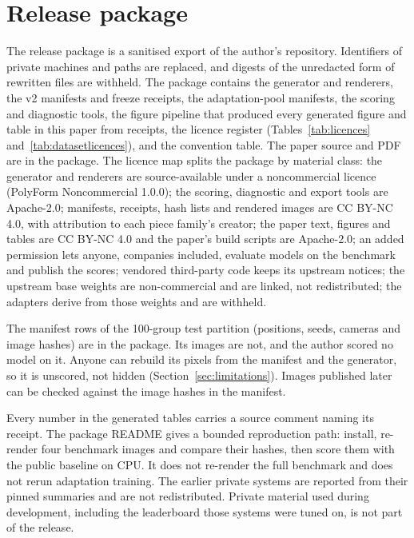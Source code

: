 \section{Release package}
\label{sec:release}

The release package is a sanitised export of the author's repository. Identifiers of private
machines and paths are replaced, and digests of the unredacted form of rewritten files are withheld. The package contains the
generator and renderers, the v2 manifests and freeze receipts, the adaptation-pool manifests, the
scoring and diagnostic tools, the figure pipeline that produced every generated figure and table in
this paper from receipts, the licence register (Tables~\ref{tab:licences} and~\ref{tab:datasetlicences}), and the convention table. The paper source and PDF are in the package. The licence
map splits the package by material class: the generator and renderers are source-available under a
noncommercial licence (PolyForm Noncommercial 1.0.0); the scoring, diagnostic and export tools are
Apache-2.0; manifests, receipts, hash lists and rendered images are CC BY-NC 4.0, with attribution to
each piece family's creator; the paper text, figures and tables are CC BY-NC 4.0 and the paper's build
scripts are Apache-2.0; an added permission lets anyone, companies included, evaluate models on the
benchmark and publish the scores; vendored third-party code keeps its upstream notices; the upstream base weights are
non-commercial and are linked, not redistributed; the adapters derive from those weights and are
withheld.

The manifest rows of the 100-group test partition (positions, seeds, cameras and image
hashes) are in the package. Its images are not, and the author scored no model on it. Anyone can
rebuild its pixels from the manifest and the generator, so it is unscored, not hidden
(Section~\ref{sec:limitations}). Images published later can be checked against the image hashes in
the manifest.

Every number in the generated tables carries a source comment naming
its receipt. The package README gives a bounded reproduction path: install, re-render four
benchmark images and compare their hashes, then score them with the public baseline on CPU. It does
not re-render the full benchmark and does not rerun adaptation training. The earlier private systems
are reported from their pinned summaries and are not redistributed. Private material used during
development, including the leaderboard those systems were tuned on, is not part of the release.
